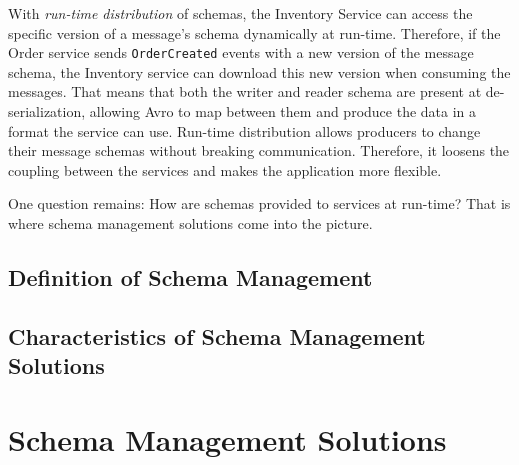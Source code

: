 With \emph{run-time distribution} of schemas, the Inventory Service can access the specific version of a message's schema dynamically at run-time.
Therefore, if the Order service sends \texttt{OrderCreated} events with a new version of the message schema, the Inventory service can download this new version when consuming the messages.
That means that both the writer and reader schema are present at de-serialization, allowing Avro to map between them and produce the data in a format the service can use.
Run-time distribution allows producers to change their message schemas without breaking communication.
Therefore, it loosens the coupling between the services and makes the application more flexible.

One question remains: How are schemas provided to services at run-time?
That is where schema management solutions come into the picture.








\subsection{Definition of Schema Management}

\subsection{Characteristics of Schema Management Solutions}

\section{Schema Management Solutions}\label{sec:schema-management-solutions}

